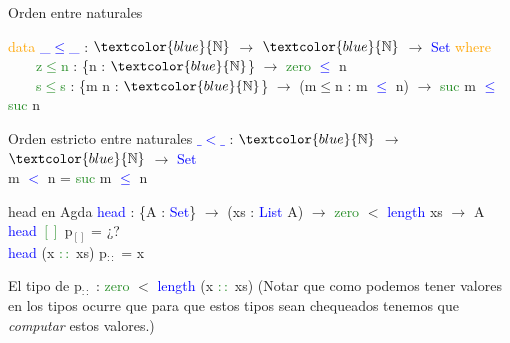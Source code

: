 \documentclass[xcolor=dvipsnames]{beamer} %
\newcommand{\cf}[1]{\textcolor{blue}{#1}}
\newcommand{\ct}[1]{\textcolor{blue}{#1}}
\newcommand{\cc}[1]{\textcolor{ForestGreen}{#1}}
\newcommand{\ck}[1]{\textcolor{orange}{#1}}
\newcommand{\N}{\ct{\mathbb{N}}}
\newcommand{\ra}{\rightarrow}
\begin{document}
\begin{frame}[shrink=5]

\begin{block}{Orden entre naturales}

\ck{data} \ct{\_$\leq$\_} : $\N$ $\ra$ $\N$ $\ra$ \ct{Set} \ck{where}\\
\ \ \ \ \cc{z$\leq$n} : \{n : $\N$\}                 $\ra$ \cc{zero}  \ct{$\leq$} n\\
\ \ \ \ \cc{s$\leq$s} : \{m n : $\N$\} $\ra$ (m$\leq$n : m \ct{$\leq$} n) $\ra$ \cc{suc} m \ct{$\leq$} \cc{suc} n

\end{block}

\begin{block}{Orden estricto entre naturales}
\cf{$\_<\_$} : $\N$ $\ra$ $\N$ $\ra$ \ct{Set}\\
m \cf{$<$} n = \cc{suc} m \cf{$\leq$} n
\end{block}

\begin{block}{head en Agda}
    \cf{head} : \{A : \ct{Set}\}  $\ra$ (xs : \ct{List} A) $\ra$ 
    \cc{zero} $<$ \ct{length} xs $\rightarrow$ A \\
    \cf{head} \cc{$[]$} p$_{[]}$ = ¿?\\
    \cf{head} (x \cc{$::$} xs) p$_{::}$ = x
  \end{block}  

\begin{block}{}
El tipo de p$_{::}$ : \cc{zero} $<$ \ct{length} (x \cc{$::$} xs) \pause
(Notar que como podemos tener valores en los tipos ocurre que para que estos tipos
sean chequeados tenemos que \textit{computar} estos valores.)
\end{block}

\end{frame}
\end{document}
